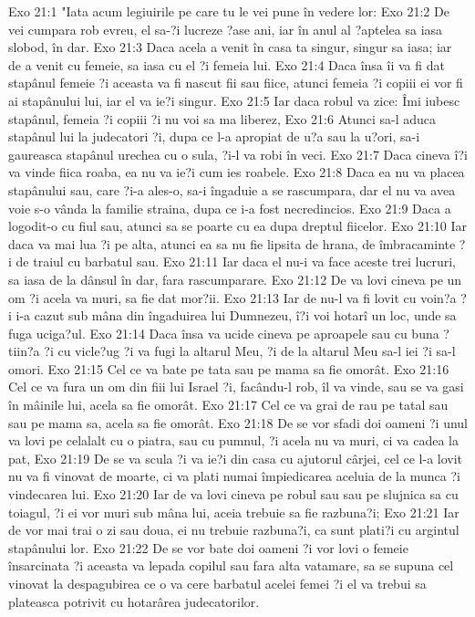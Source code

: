 Exo 21:1  "Iata acum legiuirile pe care tu le vei pune în vedere lor:
Exo 21:2  De vei cumpara rob evreu, el sa-?i lucreze ?ase ani, iar în anul al ?aptelea sa iasa slobod, în dar.
Exo 21:3  Daca acela a venit în casa ta singur, singur sa iasa; iar de a venit cu femeie, sa iasa cu el ?i femeia lui.
Exo 21:4  Daca însa îi va fi dat stapânul femeie ?i aceasta va fi nascut fii sau fiice, atunci femeia ?i copiii ei vor fi ai stapânului lui, iar el va ie?i singur.
Exo 21:5  Iar daca robul va zice: Îmi iubesc stapânul, femeia ?i copiii ?i nu voi sa ma liberez,
Exo 21:6  Atunci sa-l aduca stapânul lui la judecatori ?i, dupa ce l-a apropiat de u?a sau la u?ori, sa-i gaureasca stapânul urechea cu o sula, ?i-l va robi în veci.
Exo 21:7  Daca cineva î?i va vinde fiica roaba, ea nu va ie?i cum ies roabele.
Exo 21:8  Daca ea nu va placea stapânului sau, care ?i-a ales-o, sa-i îngaduie a se rascumpara, dar el nu va avea voie s-o vânda la familie straina, dupa ce i-a fost necredincios.
Exo 21:9  Daca a logodit-o cu fiul sau, atunci sa se poarte cu ea dupa dreptul fiicelor.
Exo 21:10  Iar daca va mai lua ?i pe alta, atunci ea sa nu fie lipsita de hrana, de îmbracaminte ?i de traiul cu barbatul sau.
Exo 21:11  Iar daca el nu-i va face aceste trei lucruri, sa iasa de la dânsul în dar, fara rascumparare.
Exo 21:12  De va lovi cineva pe un om ?i acela va muri, sa fie dat mor?ii.
Exo 21:13  Iar de nu-l va fi lovit cu voin?a ?i i-a cazut sub mâna din îngaduirea lui Dumnezeu, î?i voi hotarî un loc, unde sa fuga uciga?ul.
Exo 21:14  Daca însa va ucide cineva pe aproapele sau cu buna ?tiin?a ?i cu vicle?ug ?i va fugi la altarul Meu, ?i de la altarul Meu sa-l iei ?i sa-l omori.
Exo 21:15  Cel ce va bate pe tata sau pe mama sa fie omorât.
Exo 21:16  Cel ce va fura un om din fiii lui Israel ?i, facându-l rob, îl va vinde, sau se va gasi în mâinile lui, acela sa fie omorât.
Exo 21:17  Cel ce va grai de rau pe tatal sau sau pe mama sa, acela sa fie omorât.
Exo 21:18  De se vor sfadi doi oameni ?i unul va lovi pe celalalt cu o piatra, sau cu pumnul, ?i acela nu va muri, ci va cadea la pat,
Exo 21:19  De se va scula ?i va ie?i din casa cu ajutorul cârjei, cel ce l-a lovit nu va fi vinovat de moarte, ci va plati numai împiedicarea aceluia de la munca ?i vindecarea lui.
Exo 21:20  Iar de va lovi cineva pe robul sau sau pe slujnica sa cu toiagul, ?i ei vor muri sub mâna lui, aceia trebuie sa fie razbuna?i;
Exo 21:21  Iar de vor mai trai o zi sau doua, ei nu trebuie razbuna?i, ca sunt plati?i cu argintul stapânului lor.
Exo 21:22  De se vor bate doi oameni ?i vor lovi o femeie însarcinata ?i aceasta va lepada copilul sau fara alta vatamare, sa se supuna cel vinovat la despagubirea ce o va cere barbatul acelei femei ?i el va trebui sa plateasca potrivit cu hotarârea judecatorilor.
